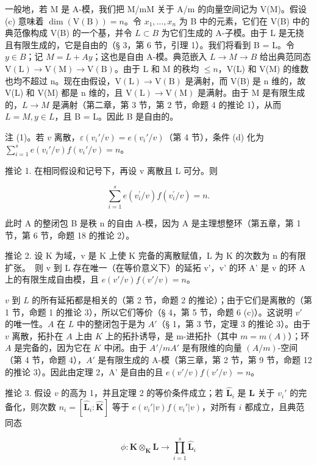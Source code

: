 一般地，若 M 是 A-模，我们把 M/mM 关于 A/m 的向量空间记为 V(M)。假设 (c) 意味着 \(\dim(\mathrm{V}(\mathrm{B})) = n\)。令 \(x_{1}, \ldots, x_{n}\) 为 B 中的元素，它们在 V(B) 中的典范像构成 V(B) 的一个基，并令 \(L \subset B\) 为它们生成的 A-子模。由于 L 是无挠且有限生成的，它是自由的（§ 3，第 6 节，引理 1）。我们将看到 B = L。令 \(y \in B\)；记 \(M = L + Ay\)；这也是自由 A-模。典范嵌入 \(L \to M \to B\) 给出典范同态 \(\mathrm{V}(\mathrm{L}) \to \mathrm{V}(\mathrm{M}) \to \mathrm{V}(\mathrm{B})\)。由于 L 和 M 的秩均 \(\leqslant n\)，V(L) 和 V(M) 的维数也均不超过 n。现在由假设，\(\mathrm{V}(\mathrm{L}) \to \mathrm{V}(\mathrm{B})\) 是满射，而 V(B) 是 n 维的，故 V(L) 和 V(M) 都是 n 维的，且 \(\mathrm{V}(\mathrm{L}) \to \mathrm{V}(\mathrm{M})\) 是满射。由于 M 是有限生成的，\(L \to M\) 是满射（第二章，第 3 节，第 2 节，命题 4 的推论 1），从而 \(L = M, y \in L\)，且 B = L。因此 B 是自由的。

注 (1)。若 \(v\) 离散，\(\varepsilon(v_i'/v) = e(v_i'/v)\)（第 4 节），条件 (d) 化为 \(\sum_{i=1}^{s} e(v_i'/v)f(v_i'/v) = n\)。

推论 1. 在相同假设和记号下，再设 v 离散且 L 可分。则

\[
\sum_ {i = 1} ^ {s} e (v _ {i} ^ {\prime} / v) f (v _ {i} ^ {\prime} / v) = n.
\]

此时 A 的整闭包 B 是秩 n 的自由 A-模，因为 A 是主理想整环（第五章，第 1 节，第 6 节，命题 18 的推论 2）。

推论 2. 设 K 为域，v 是 K 上使 K 完备的离散赋值，L 为 K 的次数为 n 的有限扩张。~则 v 到 L 存在唯一（在等价意义下）的延拓 v'，v' 的环 A' 是 v 的环 A 上的有限生成自由模，且 \(e(v'/v)f(v'/v)=n\)。

\(v\) 到 \(L\) 的所有延拓都是相关的（第 2 节，命题 2 的推论）；由于它们是离散的（第 1 节，命题 1 的推论 3），所以它们等价（§ 4，第 5 节，命题 6 (c)）。这说明 \(v'\) 的唯一性。\(A\) 在 \(L\) 中的整闭包于是为 \(A'\)（§ 1，第 3 节，定理 3 的推论 3）。由于 \(v\) 离散，拓扑在 \(A\) 上由 \(K\) 上的拓扑诱导，是 m-进拓扑（其中 \(m = m(A)\)）；环 \(A\) 是完备的，因为它在 \(K\) 中闭。由于 \(A'/mA'\) 是有限维的向量 \((A/m)\)-空间（第 4 节，命题 4），\(A'\) 是有限生成的 A-模（第三章，第 2 节，第 9 节，命题 12 的推论 3）。因此由定理 2，A' 是自由的且 \(e(v'/v)f(v'/v) = n\)。

推论 3. 假设 \(v\) 的高为 1，并且定理 2 的等价条件成立；若 \(\hat{\mathbf{L}}_i\) 是 \(\mathbf{L}\) 关于 \(v_i'\) 的完备化，则次数 \(n_i = [\hat{\mathbf{L}}_i: \hat{\mathbf{K}}]\) 等于 \(e(v_i'|v)f(v_i'|v)\)，对所有 \(i\) 都成立，且典范同态

\[
\phi \colon \hat {\mathbf {K}} \otimes_ {\mathbf {K}} \mathbf {L} \rightarrow \prod_ {i = 1} ^ {s} \hat {\mathbf {L}} _ {i}
\]

